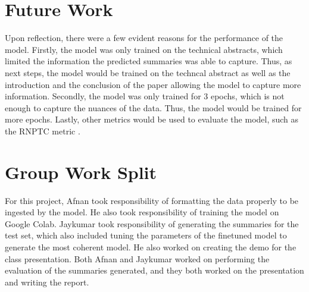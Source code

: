\documentclass[11pt,a4paper]{article}
\begin{document}
\section{Future Work}

\indent \indent Upon reflection, there were a few evident reasons for the performance of the model. Firstly, the model was only trained on the technical abstracts, which limited the information the predicted summaries was able to capture. Thus, as next steps, the model would be trained on the techncal abstract as well as the introduction and the conclusion of the paper allowing the model to capture more information. Secondly, the model was only trained for 3 epochs, which is not enough to capture the nuances of the data. Thus, the model would be trained for more epochs. Lastly, other metrics would be used to evaluate the model, such as the RNPTC metric \cite{luo2022readability}.

\appendix

\section{Group Work Split}
For this project, Afnan took responsibility of formatting the data properly to be ingested by the model. He also took responsibility of training the model on Google Colab. Jaykumar took responsibility of generating the summaries for the test set, which also included tuning the parameters of the finetuned model to generate the most coherent model. He also worked on creating the demo for the class presentation. Both Afnan and Jaykumar worked on performing the evaluation of the summaries generated, and they both worked on the presentation and writing the report.



\end{document}
